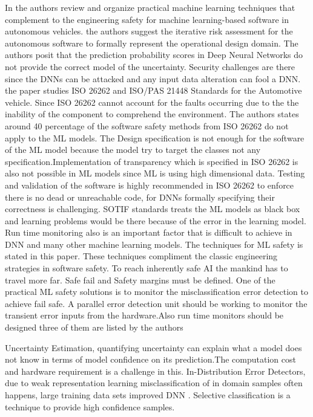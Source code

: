 {In \cite{author27} the authors review and organize practical machine learning techniques that complement to the engineering safety for machine learning-based software in autonomous vehicles. the authors suggest the iterative risk assessment for the autonomous software to formally represent the operational design domain. The authors posit that the prediction probability scores in Deep Neural Networks do not provide the correct model of the uncertainty. Security challenges are there since the DNNs can be attacked and any input data alteration can fool a DNN. the paper studies ISO 26262 and ISO/PAS 21448 Standards for the Automotive vehicle. Since ISO 26262 cannot account for the faults occurring due to the the inability of the component to comprehend the environment. The authors states around 40 percentage of the software safety methods from ISO 26262 do not apply to the ML models. The Design specification is not enough for the software of the ML model because the model try to target the classes not any specification.Implementation of transparency which is specified in ISO 26262 is also not possible in ML models since ML is using high dimensional data. Testing and validation of the software is highly recommended in ISO 26262 to enforce there is no dead or unreachable code, for DNNs formally specifying their correctness is challenging. SOTIF standards  treats the ML models as black box and learning problems would be there because of the error in the learning model. Run time monitoring also is an important factor that is difficult to achieve in DNN and many other machine learning models. The techniques for ML safety is stated in this paper. These techniques compliment the classic engineering  strategies in software safety. To reach inherently safe AI the mankind has to travel more far. Safe fail and Safety margins must be defined. One of the practical ML safety solutions is to monitor the misclassification error detection to achieve fail safe. A parallel error detection unit should be working to monitor the transient error inputs from the hardware.Also run time monitors should be designed three of them are listed by the authors 

Uncertainty Estimation, quantifying uncertainty can explain what a model does not know in terms of model confidence on its prediction.The computation cost and hardware requirement is a challenge in this.
In-Distribution Error Detectors, due to weak representation learning misclassification of in domain samples often happens, large training data sets improved DNN . Selective classification is a technique to provide high confidence samples.

}

